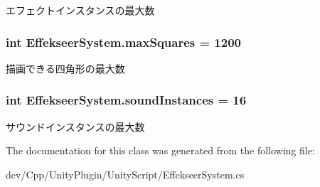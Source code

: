 エフェクトインスタンスの最大数 

\hypertarget{class_effekseer_system_a2007e297eab6bc504cce40650679b1c4}{
\subsubsection[{max\-Squares}]{\setlength{\rightskip}{0pt plus 5cm}int Effekseer\-System.\-max\-Squares = 1200}}\label{class_effekseer_system_a2007e297eab6bc504cce40650679b1c4}


描画できる四角形の最大数 

\hypertarget{class_effekseer_system_ac83155c54d94fc6b61f6f53032923667}{
\subsubsection[{sound\-Instances}]{\setlength{\rightskip}{0pt plus 5cm}int Effekseer\-System.\-sound\-Instances = 16}}\label{class_effekseer_system_ac83155c54d94fc6b61f6f53032923667}


サウンドインスタンスの最大数 



The documentation for this class was generated from the following file\-:\begin{DoxyCompactItemize}
\item 
dev/\-Cpp/\-Unity\-Plugin/\-Unity\-Script/Effekseer\-System.\-cs\end{DoxyCompactItemize}
